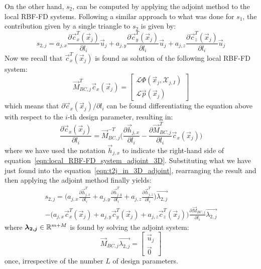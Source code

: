 On the other hand, $s_2$, can be computed by applying the adjoint method to the local RBF-FD systems. Following a similar approach to what was done for $s_1$, the contribution given by a single triangle to $s_2$ is given by:
\begin{equation}
	\label{eqn:t2j_in_3D_adjoint}
	s_{2,j} = a_{j,x}\frac{\partial \vec{c}_x^T(\vec{x}_j)}{\partial l_i}\vec{u}_j + a_{j,y}\frac{\partial \vec{c}_y^T(\vec{x}_j)}{\partial l_i}\vec{u}_j + a_{j,z}\frac{\partial \vec{c}_z^T(\vec{x}_j)}{\partial l_i}\vec{u}_j
\end{equation}
Now we recall that $\vec{c}_x^T(\vec{x}_j)$ is found as solution of the following local RBF-FD system:
\begin{equation}
	\label{eqn:local_RBF-FD_system_adjoint_3D}
	\vec{M}_{BC,j}^T \vec{c}_x(\vec{x}_j) =
	\begin{bmatrix}
		\mathcal{L} \Phi(\vec{x}_j, \mathcal{X}_{j,I})  \\
		\mathcal{L} \vec{p}(\vec{x}_j)
	\end{bmatrix}
\end{equation}
which means that $\partial \vec{c}_x(\vec{x}_j) / \partial l_i$ can be found differentiating the equation above with respect to the $i$-th design parameter, resulting in:
\begin{equation}
	\label{eqn:local_RBF-FD_system_differentited}
	\frac{\partial \vec{c}_x(\vec{x}_j)}{\partial l_i} = \vec{M}_{BC,j}^{-T} \biggl( \frac{\partial \vec{h}_{j,x}}{\partial l_i} - \frac{\partial \vec{M}_{BC,j}^T}{\partial l_i}\vec{c}_x(\vec{x}_j) \biggr)
\end{equation}
where we have used the notation $\vec{h}_{j,x}$ to indicate the right-hand side of equation~\eqref{eqn:local_RBF-FD_system_adjoint_3D}.
Substituting what we have just found into the equation~\eqref{eqn:t2j_in_3D_adjoint}, rearranging the result and then applying the adjoint method finally yields:
\begin{multline}
	s_{2,j} = \biggl( a_{j,x} \frac{\partial \vec{h}_{j,x}^T}{\partial l_i} + a_{j,y} \frac{\partial \vec{h}_{j,y}^T}{\partial l_i} + a_{j,z} \frac{\partial \vec{h}_{j,z}^T}{\partial l_i} \biggr) \vec{\lambda_{2,j}}  \\
	 - \biggl( a_{j,x}\vec{c}_x^T(\vec{x}_j) + a_{j,y}\vec{c}_y^T(\vec{x}_j) + a_{j,z}\vec{c}_z^T(\vec{x}_j) \biggr) \frac{\partial \vec{M}_{BC,j}}{\partial l_i} \vec{\lambda_{2,j}}
\end{multline}
where $\boldsymbol{\lambda_{2,j}} \in \mathbb{R}^{m+M}$ is found by solving the adjoint system:
\begin{equation}
	\label{eqn:adjoint_system_t2j}
	\vec{M}_{BC,j} \vec{\lambda_{2,j}} =
	\begin{bmatrix}
		\vec{u}_j  \\
		\vec{0}
	\end{bmatrix}
\end{equation}
once, irrespective of the number $L$ of design parameters.

